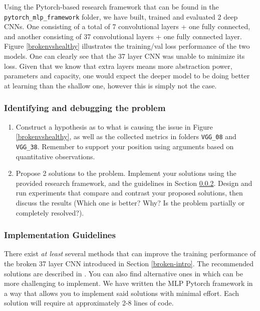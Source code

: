 \documentclass[11pt,]{article}
\begin{document}
Using the Pytorch-based research framework that can be found in the \texttt{pytorch\_mlp\_framework} folder, we have built, trained and evaluated 2 deep CNNs. One consisting of a total of 7 convolutional layers + one fully connected, and another consisting of 37 convolutional layers + one fully connected layer. Figure \ref{brokenvshealthy} illustrates the training/val loss performance of the two models. One can clearly see that the 37 layer CNN was unable to minimize its loss. Given that we know that extra layers means more abstraction power, parameters and capacity, one would expect the deeper model to be doing better at learning than the shallow one, however this is simply not the case. 

\subsubsection{Identifying and debugging the problem}\label{broken-high-level}

\begin{enumerate}
    \item Construct a hypothesis as to what is causing the issue in Figure \ref{brokenvshealthy}, as well as the collected metrics in folders \texttt{VGG\_08} and \texttt{VGG\_38}. Remember to support your position using arguments based on quantitative observations. 
    \item Propose 2 solutions to the problem. Implement your solutions using the provided research framework, and the guidelines in Section \ref{block-implementation-notes}. Design and run experiments that compare and contrast your proposed solutions, then discuss the results (Which one is better? Why? Is the problem partially or completely resolved?).
\end{enumerate}

\subsubsection{Implementation Guidelines}\label{block-implementation-notes}
There exist \emph{at least} several methods that can improve the training performance of the broken 37 layer CNN introduced in Section \ref{broken-intro}. The recommended solutions are described in 
\cite{ioffe2015batch, he2016deep}. You can also find alternative ones in \cite{huang2017densely, lee2015deeply} which can be more challenging to implement. We have written the MLP Pytorch framework in a way that allows you to implement said solutions with minimal effort. Each solution will require at approximately 2-8 lines of code. 
\end{document}
